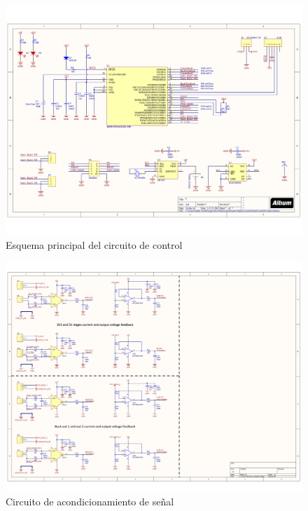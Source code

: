 \documentclass[12pt]{report}
\begin{document}
\begin{figure}
	\centering
	\includegraphics[width=\textwidth,height=\textheight,keepaspectratio]{sch_control_main} 
	\caption{Esquema principal del circuito de control}
	\label{control:main}
\end{figure}

\begin{figure}
	\centering
	\includegraphics[width=\textwidth,height=\textheight,keepaspectratio]{sch_control_feedback} 
	\caption{Circuito de acondicionamiento de señal}
	\label{control:feedback}
\end{figure}
\end{document}
